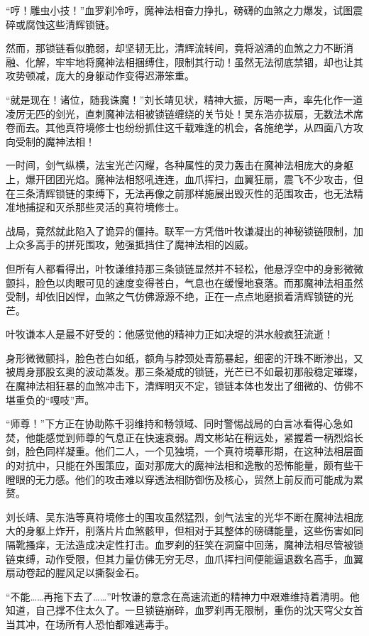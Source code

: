 “哼！雕虫小技！”血罗刹冷哼，魔神法相奋力挣扎，磅礴的血煞之力爆发，试图震碎或腐蚀这些清辉锁链。

然而，那锁链看似脆弱，却坚韧无比，清辉流转间，竟将汹涌的血煞之力不断消融、化解，牢牢地将魔神法相捆缚住，限制其行动！虽然无法彻底禁锢，却也让其攻势顿减，庞大的身躯动作变得迟滞笨重。

“就是现在！诸位，随我诛魔！”刘长靖见状，精神大振，厉喝一声，率先化作一道凌厉无匹的剑光，直刺魔神法相被锁链缠绕的关节处！吴东浩亦拔扇，无数法术席卷而去。其他真符境修士也纷纷抓住这千载难逢的机会，各施绝学，从四面八方攻向受制的魔神法相！

一时间，剑气纵横，法宝光芒闪耀，各种属性的灵力轰击在魔神法相庞大的身躯上，爆开团团光焰。魔神法相怒吼连连，血爪挥扫，血翼狂扇，震飞不少攻击，但在三条清辉锁链的束缚下，无法再像之前那样施展出毁灭性的范围攻击，也无法精准地捕捉和灭杀那些灵活的真符境修士。

战局，竟然就此陷入了诡异的僵持。联军一方凭借叶牧谦凝出的神秘锁链限制，加上众多高手的拼死围攻，勉强抵挡住了魔神法相的凶威。

但所有人都看得出，叶牧谦维持那三条锁链显然并不轻松，他悬浮空中的身影微微颤抖，脸色以肉眼可见的速度变得苍白，气息也在缓慢地衰落。而那魔神法相虽然受制，却依旧凶悍，血煞之气仿佛源源不绝，正在一点点地磨损着清辉锁链的光芒。

叶牧谦本人是最不好受的：他感觉他的精神力正如决堤的洪水般疯狂流逝！

身形微微颤抖，脸色苍白如纸，额角与脖颈处青筋暴起，细密的汗珠不断渗出，又被周身那股玄奥的波动蒸发。那三条凝成的锁链，光芒已不如最初那般稳定璀璨，在魔神法相狂暴的血煞冲击下，清辉明灭不定，锁链本体也发出了细微的、仿佛不堪重负的“嘎吱”声。

“师尊！”下方正在协助陈千羽维持和畅领域、同时警惕战局的白言冰看得心急如焚，他能感觉到师尊的气息正在快速衰弱。周文彬站在稍远处，紧握着一柄烈焰长剑，脸色同样凝重。他们二人，一个见独境，一个真符境摹形期，在这种法相层面的对抗中，只能在外围策应，面对那庞大的魔神法相和逸散的恐怖能量，颇有些干瞪眼的无力感。他们的攻击难以穿透法相防御伤及核心，贸然上前反而可能成为累赘。

刘长靖、吴东浩等真符境修士的围攻虽然猛烈，剑气法宝的光华不断在魔神法相庞大的身躯上炸开，削落片片血煞骸甲，但相对于其整体的磅礴能量，这些伤害如同隔靴搔痒，无法造成决定性打击。血罗刹的狂笑在洞窟中回荡，魔神法相尽管被锁链束缚，动作受限，但其力量仿佛无穷无尽，血爪挥扫间便能逼退数名高手，血翼扇动卷起的腥风足以撕裂金石。

“不能……再拖下去了……”叶牧谦的意念在高速流逝的精神力中艰难维持着清明。他知道，自己撑不住太久了。一旦锁链崩碎，血罗刹再无限制，重伤的沈天穹父女首当其冲，在场所有人恐怕都难逃毒手。

